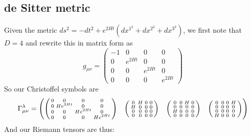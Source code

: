 \documentclass{article}
\begin{document}
		\subsection{de Sitter metric}
		Given the metric $ds^2 = -dt^2 + e^{2Ht} \left( dx^{{1}^2} + dx^{{2}^2} + dx^{{3}^2} \right)$, we first note that $D=4$ and rewrite this in matrix form as
		$$ g_{\mu\nu} = \begin{pmatrix}
			-1 & 0 & 0 & 0 \\
			0 & e^{2Ht} & 0 & 0 \\
			0 & 0 & e^{2Ht} & 0 \\
			0 & 0 & 0 & e^{2Ht}
		\end{pmatrix}$$
		So our Christoffel symbols are
		$$ \Gamma_{\mu\nu}^\lambda = \begin{pmatrix}
		\begin{psmallmatrix}
			0 & 0 & 0 & 0 \\
			0 & He^{2Ht} & 0 & 0 \\
			0 & 0 & He^{2Ht} & 0 \\
			0 & 0 & 0 & He^{2Ht}
		\end{psmallmatrix} & 
		\begin{psmallmatrix}
			0 & H & 0 & 0 \\
			H & 0 & 0 & 0 \\
			0 & 0 & 0 & 0 \\
			0 & 0 & 0 & 0
		\end{psmallmatrix} &
		\begin{psmallmatrix}
			0 & 0 & H & 0 \\
			0 & 0 & 0 & 0 \\
			H & 0 & 0 & 0 \\
			0 & 0 & 0 & 0
		\end{psmallmatrix} &
		\begin{psmallmatrix}
			0 & 0 & 0 & H \\
			0 & 0 & 0 & 0 \\
			0 & 0 & 0 & 0 \\
			H & 0 & 0 & 0
		\end{psmallmatrix} 
		\end{pmatrix}
		$$
		And our Riemann tensors are thus:
\end{document}
